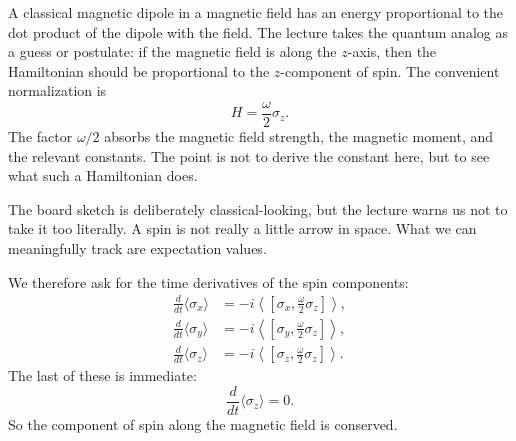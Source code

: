 A classical magnetic dipole in a magnetic field has an energy proportional to the dot product of the dipole with the field. The lecture takes the quantum analog as a guess or postulate: if the magnetic field is along the \(z\)-axis, then the Hamiltonian should be proportional to the \(z\)-component of spin. The convenient normalization is
\begin{equation}
H=\frac{\omega}{2}\sigma_z.
\end{equation}
The factor \(\omega/2\) absorbs the magnetic field strength, the magnetic moment, and the relevant constants. The point is not to derive the constant here, but to see what such a Hamiltonian does.

The board sketch is deliberately classical-looking, but the lecture warns us not to take it too literally. A spin is not really a little arrow in space. What we can meaningfully track are expectation values.

We therefore ask for the time derivatives of the spin components:
\begin{align}
\frac{d}{dt}\langle \sigma_x\rangle
&=
-i\left\langle \left[\sigma_x,\frac{\omega}{2}\sigma_z\right]\right\rangle, \\
\frac{d}{dt}\langle \sigma_y\rangle
&=
-i\left\langle \left[\sigma_y,\frac{\omega}{2}\sigma_z\right]\right\rangle, \\
\frac{d}{dt}\langle \sigma_z\rangle
&=
-i\left\langle \left[\sigma_z,\frac{\omega}{2}\sigma_z\right]\right\rangle.
\end{align}
The last of these is immediate:
\begin{equation}
\frac{d}{dt}\langle \sigma_z\rangle = 0.
\end{equation}
So the component of spin along the magnetic field is conserved.

